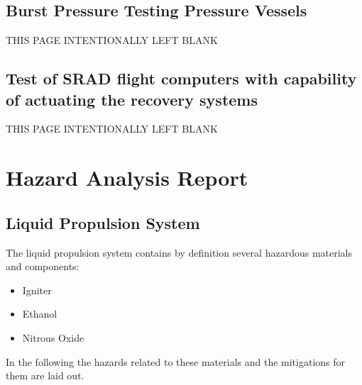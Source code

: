



\subsection{Burst Pressure Testing Pressure Vessels}

THIS PAGE INTENTIONALLY LEFT BLANK

\newpage

\subsection{Test of SRAD flight computers with capability of actuating the recovery systems}

THIS PAGE INTENTIONALLY LEFT BLANK

\newpage

\section{Hazard Analysis Report}

\subsection{Liquid Propulsion System}

The liquid propulsion system contains by definition several hazardous materials and components:

\begin{itemize}
    \item Igniter
    \item Ethanol
    \item Nitrous Oxide
\end{itemize}

In the following the hazards related to these materials and the mitigations for them are laid out.

